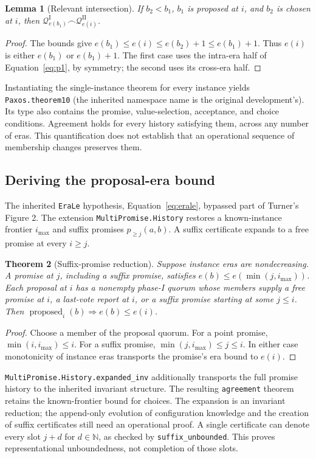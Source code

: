 \documentclass[10pt,journal,letterpaper]{IEEEtran}
\newtheorem{theorem}{Theorem}
\newtheorem{lemma}[theorem]{Lemma}
\newcommand{\QI}{\mathcal Q^{\mathrm I}}
\newcommand{\QII}{\mathcal Q^{\mathrm {II}}}
\newcommand{\inter}{\mathrel{\frown}}
\newcommand{\proposed}{\operatorname{proposed}}
\newcommand{\code}[1]{\texttt{\small #1}}
\begin{document}
\begin{lemma}[Relevant intersection]
If $b_2<b_1$, $b_1$ is proposed at $i$, and $b_2$ is chosen at $i$, then
$\QI_{e(b_1)}\inter\QII_{e(i)}$.
\end{lemma}
\begin{proof}
The bounds give $e(b_1)\le e(i)\le e(b_2)+1\le e(b_1)+1$.
Thus $e(i)$ is either $e(b_1)$ or $e(b_1)+1$. The first case uses the
intra-era half of Equation~\eqref{eq:p1}, by symmetry; the second uses its
cross-era half.
\end{proof}
Instantiating the single-instance theorem for every instance yields
\code{Paxos.theorem10} (the inherited namespace name is the original
development's). Its type also contains the promise, value-selection,
acceptance, and choice conditions. Agreement holds for every history
satisfying them, across any number of eras. This quantification does not
establish that an operational sequence of membership changes preserves them.

\subsection{Deriving the proposal-era bound}
The inherited \code{EraLe} hypothesis, Equation~\eqref{eq:erale}, bypassed
part of Turner's Figure 2. The extension \code{MultiPromise.History} restores a
known-instance frontier $i_{\max}$ and suffix promises $p_{\ge j}(a,b)$.
A suffix certificate expands to a free promise at every $i\ge j$.

\begin{theorem}[Suffix-promise reduction]
Suppose instance eras are nondecreasing. A promise at $j$, including a suffix
promise, satisfies $e(b)\le e(\min(j,i_{\max}))$. Each proposal at $i$ has a
nonempty phase-I quorum whose members supply a free promise at $i$, a last-vote
report at $i$, or a suffix promise starting at some $j\le i$. Then
$\proposed_i(b)\Rightarrow e(b)\le e(i)$.
\end{theorem}
\begin{proof}
Choose a member of the proposal quorum. For a point promise,
$\min(i,i_{\max})\le i$. For a suffix promise,
$\min(j,i_{\max})\le j\le i$. In either case monotonicity of instance eras
transports the promise's era bound to $e(i)$.
\end{proof}
\code{MultiPromise.History.expanded\_inv} additionally transports the full
promise history to the inherited invariant structure. The resulting
\code{agreement} theorem retains the known-frontier bound for choices.
The expansion is an invariant reduction; the append-only evolution of
configuration knowledge and the creation of suffix certificates still need an
operational proof. A single certificate can denote every slot $j+d$ for
$d\in\mathbb N$, as checked by \code{suffix\_unbounded}. This proves
representational unboundedness, not completion of those slots.
\end{document}
